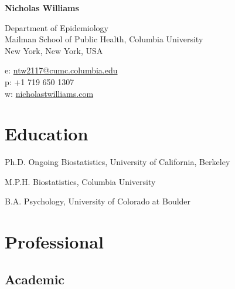 \documentclass[12pt,letterpaper]{report}
\newcommand{\myname}{Nicholas Williams}
\newcommand{\namefont}[1]{{\normalfont\bfseries\Huge{#1}}}
\begin{document}
    \raggedright

    \namefont{\myname}

    \vspace{1em}
    \begin{minipage}[t]{0.64\textwidth}
        Department of Epidemiology \\
        Mailman School of Public Health, Columbia University
        \\ New York, New York, USA
    \end{minipage}
    \begin{minipage}[t]{0.34\textwidth}
        e: \href{mailto:ntw2117@cumc.columbia.edu}{ntw2117@cumc.columbia.edu} \\
        p: +1 719 650 1307 \\
        w: \href{https://nicholastwilliams.com/}{nicholastwilliams.com}
    \end{minipage}
    \vspace{0.5em}

    \section*{Education}

    \begin{tablist}
    
    	\item[Ph.D.] \tab Ongoing \tab Biostatistics, University of California, Berkeley

        \item[M.P.H.]   \tab Biostatistics, Columbia University

        \item[B.A.]   \tab Psychology, University of Colorado at Boulder

    \end{tablist}

    \section*{Professional}
    
    \subsection*{Academic}
\end{document}
